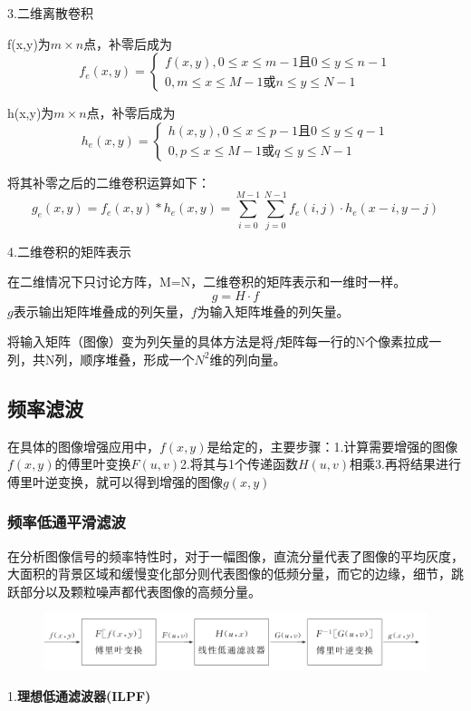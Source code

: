 \documentclass[11pt]{article}
\begin{document}
3.二维离散卷积

f(x,y)为$m\times n$点，补零后成为
$$f_e(x,y)=\left\{\begin{matrix}
	f(x,y), 0\leq x\leq m-1 \text{且} 0\leq y\leq n-1\\ 
	0, m\leq x\leq M-1\text{或}n\leq y\leq N-1
\end{matrix}\right.$$

h(x,y)为$m\times n$点，补零后成为
$$h_e(x,y)=\left\{\begin{matrix}
	h(x,y), 0\leq x\leq p-1 \text{且} 0\leq y\leq q-1\\ 
	0, p\leq x\leq M-1\text{或}q\leq y\leq N-1
\end{matrix}\right.$$

将其补零之后的二维卷积运算如下：
$$g_e(x,y)=f_e(x,y)*h_e(x,y)=\sum_{i=0}^{M-1}\sum_{j=0}^{N-1}f_e(i,j)\cdot h_e(x-i,y-j)$$

4.二维卷积的矩阵表示

在二维情况下只讨论方阵，M=N，二维卷积的矩阵表示和一维时一样。
$$g = H\cdot f$$
$g$表示输出矩阵堆叠成的列矢量，$f$为输入矩阵堆叠的列矢量。

将输入矩阵（图像）变为列矢量的具体方法是将$f$矩阵每一行的N个像素拉成一列，共N列，顺序堆叠，形成一个$N^2$维的列向量。 

\subsection{频率滤波}
在具体的图像增强应用中，$f(x,y)$是给定的，主要步骤：1.计算需要增强的图像$f(x,y)$的傅里叶变换$F(u,v)$2.将其与1个传递函数$H(u,v)$相乘3.再将结果进行傅里叶逆变换，就可以得到增强的图像$g(x,y)$

\subsubsection{频率低通平滑滤波}
在分析图像信号的频率特性时，对于一幅图像，直流分量代表了图像的平均灰度，大面积的背景区域和缓慢变化部分则代表图像的低频分量，而它的边缘，细节，跳跃部分以及颗粒噪声都代表图像的高频分量。
\begin{figure}[H]
	\centering
	\includegraphics[scale=0.7]{30}
\end{figure}

1.\textbf{理想低通滤波器(ILPF)}
\end{document}
